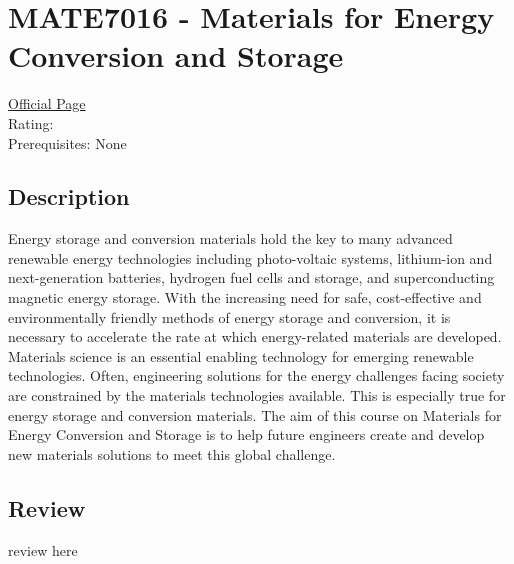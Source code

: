 \hypertarget{MATE7016}{\section{MATE7016 - Materials for Energy Conversion and Storage}}

\large
\textcolor{turbo_purple}{\href{https://my.uq.edu.au/programs-courses/course.html?course_code=MATE7016}{Official Page}} \\
Rating: \cstar\cstar\cstar\cstar\ostar \\
Prerequisites: None

\normalsize
\subsection*{Description}
Energy storage and conversion materials hold the key to many advanced renewable energy technologies including photo-voltaic systems, lithium-ion and next-generation batteries, hydrogen fuel cells and storage, and superconducting magnetic energy storage.
With the increasing need for safe, cost-effective and environmentally friendly methods of energy storage and conversion, it is necessary to accelerate the rate at which energy-related materials are developed.
Materials science is an essential enabling technology for emerging renewable technologies.
Often, engineering solutions for the energy challenges facing society are constrained by the materials technologies available.
This is especially true for energy storage and conversion materials.
The aim of this course on Materials for Energy Conversion and Storage is to help future engineers create and develop new materials solutions to meet this global challenge.

\subsection*{Review}
review here
